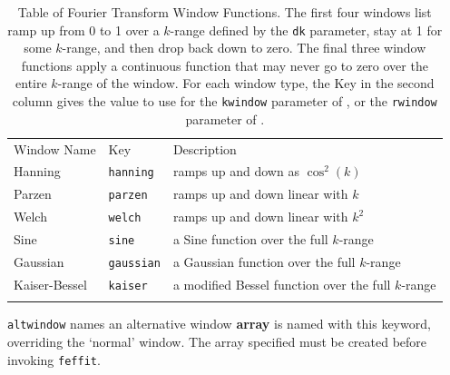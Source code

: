 \begin{table}
  \begin{center}
    \caption[a]{Table of Fourier Transform Window Functions.  The first
      four windows list ramp up from 0 to 1 over a $k$-range defined by the
      {\tt{dk}} parameter, stay at 1 for some $k$-range, and then drop back
      down to zero.  The final three window functions apply a continuous
      function that may never go to zero over the entire $k$-range of the
      window.  For each window type, the Key in the second column gives the
      value to use for the {\tt{kwindow}} parameter of {}, or
      the {\tt{rwindow}} parameter of {}.  \smallskip }
    {\label{Table:FTwins}}
    \begin{tabular}{lll}
    \noalign{\smallskip}%
    {Window Name} & {Key} & Description  \\ 
    \noalign{\smallskip}    \hline    \noalign{\smallskip}    
    Hanning            & {\tt{hanning}} &  ramps up and down as $\cos^2(k)$ \\
    Parzen             & {\tt{parzen}}  &  ramps up and down linear with $k$\\
    Welch              & {\tt{welch}}   &  ramps up and down linear with $k^2$\\
    \noalign{\smallskip}
    Sine               & {\tt{sine}}    &  a Sine function over the full $k$-range\\
    Gaussian           & {\tt{gaussian}}&  a Gaussian function over the full  $k$-range\\
    Kaiser-Bessel      & {\tt{kaiser}}  &  a modified Bessel function over the full $k$-range\\
    \noalign{\smallskip}    \hline
    \end{tabular}
  \end{center}
\end{table}
  
{\tt{altwindow}} names an alternative window {\bf{array}} is named with
   this keyword, overriding the `normal' window.  The array specified must be
   created before invoking {\tt{feffit}}. 



